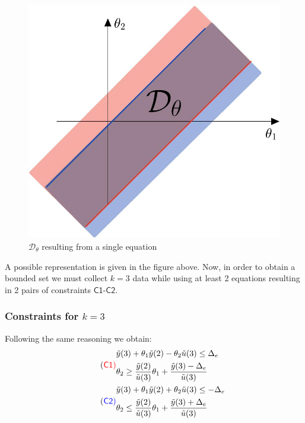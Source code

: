 \begin{figure}[h]
    \centering
    \includegraphics[scale=0.22]{img/strip.jpeg}
    \caption{$\mathcal{D}_\theta$ resulting from a single equation}
\end{figure}
\noindent
A possible representation is given in the figure above. Now, in order to obtain a bounded set we must collect $k=3$ data while using at least 2 equations resulting in 2 pairs of constraints $\textsf{C1-C2}$.
\subsubsection{Constraints for \color{red} $k=3$}
Following the same reasoning we obtain:
\begin{align}
    \tag{\color{red}\textsf{C1}}
    &\begin{aligned}\label{eq:c1_1}
        &\tilde{y}(3)+\theta_1{\tilde{y}(2)}-\theta_2\tilde{u}(3) \le \Delta_e \\
        &\theta_2 \ge \frac{\tilde{y}(2)}{\tilde{u}(3)}\theta_1 + \frac{\tilde{y}(3)-\Delta_e}{\tilde{u}(3)}
    \end{aligned}\\
    \tag{\color{blue}\textsf{C2}}
    &\begin{aligned}\label{eq:c1_1}
        &\tilde{y}(3)+\theta_1{\tilde{y}(2)}+\theta_2\tilde{u}(3) \le -\Delta_e \\
        &\theta_2 \le \frac{\tilde{y}(2)}{\tilde{u}(3)}\theta_1 + \frac{\tilde{y}(3)+\Delta_e}{\tilde{u}(3)}
    \end{aligned}
\end{align}

